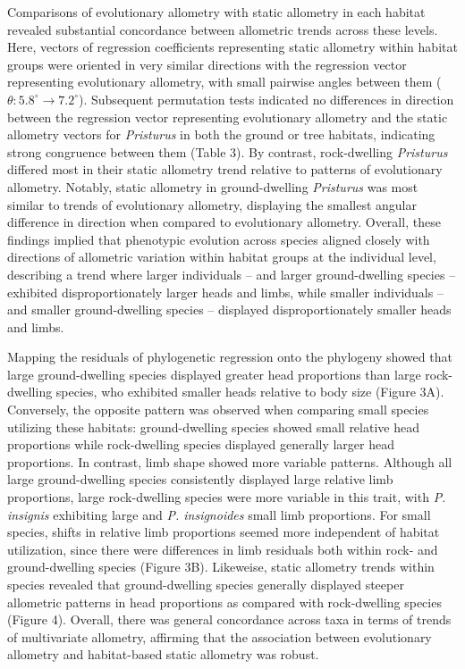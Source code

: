 \documentclass[
  11pt,
]{article}
\begin{document}
Comparisons of evolutionary allometry with static allometry in each
habitat revealed substantial concordance between allometric trends
across these levels. Here, vectors of regression coefficients
representing static allometry within habitat groups were oriented in
very similar directions with the regression vector representing
evolutionary allometry, with small pairwise angles between them
(\(\theta: 5.8^\circ\rightarrow7.2^\circ\)). Subsequent permutation
tests indicated no differences in direction between the regression
vector representing evolutionary allometry and the static allometry
vectors for \emph{Pristurus} in both the ground or tree habitats,
indicating strong congruence between them (Table 3). By contrast,
rock-dwelling \emph{Pristurus} differed most in their static allometry
trend relative to patterns of evolutionary allometry. Notably, static
allometry in ground-dwelling \emph{Pristurus} was most similar to trends
of evolutionary allometry, displaying the smallest angular difference in
direction when compared to evolutionary allometry. Overall, these
findings implied that phenotypic evolution across species aligned
closely with directions of allometric variation within habitat groups at
the individual level, describing a trend where larger individuals -- and
larger ground-dwelling species -- exhibited disproportionately larger
heads and limbs, while smaller individuals -- and smaller
ground-dwelling species -- displayed disproportionately smaller heads
and limbs. \hfill\break

Mapping the residuals of phylogenetic regression onto the phylogeny
showed that large ground-dwelling species displayed greater head
proportions than large rock-dwelling species, who exhibited smaller
heads relative to body size (Figure 3A). Conversely, the opposite
pattern was observed when comparing small species utilizing these
habitats: ground-dwelling species showed small relative head proportions
while rock-dwelling species displayed generally larger head proportions.
In contrast, limb shape showed more variable patterns. Although all
large ground-dwelling species consistently displayed large relative limb
proportions, large rock-dwelling species were more variable in this
trait, with \emph{P. insignis} exhibiting large and \emph{P.
insignoides} small limb proportions. For small species, shifts in
relative limb proportions seemed more independent of habitat
utilization, since there were differences in limb residuals both within
rock- and ground-dwelling species (Figure 3B). Likeweise, static
allometry trends within species revealed that ground-dwelling species
generally displayed steeper allometric patterns in head proportions as
compared with rock-dwelling species (Figure 4). Overall, there was
general concordance across taxa in terms of trends of multivariate
allometry, affirming that the association between evolutionary allometry
and habitat-based static allometry was robust. \hfill\break
\end{document}
